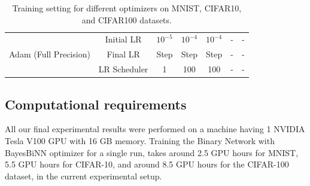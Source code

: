 \begin{table}[h]
\begin{center}
\begin{tabular}{ | c | c | c | c | c | c | c | }
   
  \multirow{3}{5em}{Adam (Full Precision)} 
   & Initial LR & $10^{-5}$ & $10^{-4}$ & $10^{-4}$ & - & - \\
   & Final LR & Step & Step & Step & - & - \\
   & LR Scheduler & 1 & 100 & 100 & - & - \\ \hline


\end{tabular}
\caption{Training setting for different optimizers on MNIST, CIFAR10, and CIFAR100 datasets.}
\label{table1}
\end{center}
\end{table}



\subsection{Computational requirements}
All our final experimental results were performed on a machine having 1 NVIDIA Tesla V100 GPU with 16 GB memory. Training the Binary Network with BayesBiNN optimizer for a single run, takes around 2.5 GPU hours for MNIST, 5.5 GPU hours for CIFAR-10, and around 8.5 GPU hours for the CIFAR-100 dataset, in the current experimental setup.

